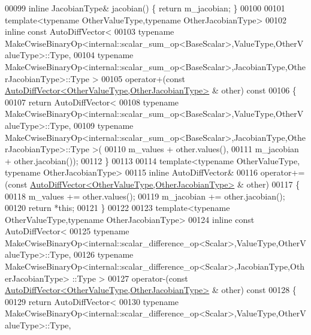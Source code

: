 \begin{DoxyCode}
00099     \textcolor{keyword}{inline} JacobianType& jacobian() \{ \textcolor{keywordflow}{return} m\_jacobian; \}
00100 
00101     \textcolor{keyword}{template}<\textcolor{keyword}{typename} OtherValueType,\textcolor{keyword}{typename} OtherJacobianType>
00102     \textcolor{keyword}{inline} \textcolor{keyword}{const} AutoDiffVector<
00103       \textcolor{keyword}{typename} MakeCwiseBinaryOp<internal::scalar\_sum\_op<BaseScalar>,ValueType,OtherValueType>::Type,
00104       \textcolor{keyword}{typename} MakeCwiseBinaryOp<internal::scalar\_sum\_op<BaseScalar>,JacobianType,OtherJacobianType>::Type 
      >
00105     operator+(\textcolor{keyword}{const} \hyperlink{class_eigen_1_1_auto_diff_vector}{AutoDiffVector<OtherValueType,OtherJacobianType>}
      & other)\textcolor{keyword}{ const}
00106 \textcolor{keyword}{    }\{
00107       \textcolor{keywordflow}{return} AutoDiffVector<
00108       \textcolor{keyword}{typename} MakeCwiseBinaryOp<internal::scalar\_sum\_op<BaseScalar>,ValueType,OtherValueType>::Type,
00109       \textcolor{keyword}{typename} MakeCwiseBinaryOp<internal::scalar\_sum\_op<BaseScalar>,JacobianType,OtherJacobianType>::Type 
      >(
00110         m\_values + other.values(),
00111         m\_jacobian + other.jacobian());
00112     \}
00113 
00114     \textcolor{keyword}{template}<\textcolor{keyword}{typename} OtherValueType, \textcolor{keyword}{typename} OtherJacobianType>
00115     \textcolor{keyword}{inline} AutoDiffVector&
00116     operator+=(\textcolor{keyword}{const} \hyperlink{class_eigen_1_1_auto_diff_vector}{AutoDiffVector<OtherValueType,OtherJacobianType>}
      & other)
00117     \{
00118       m\_values += other.values();
00119       m\_jacobian += other.jacobian();
00120       \textcolor{keywordflow}{return} *\textcolor{keyword}{this};
00121     \}
00122 
00123     \textcolor{keyword}{template}<\textcolor{keyword}{typename} OtherValueType,\textcolor{keyword}{typename} OtherJacobianType>
00124     \textcolor{keyword}{inline} \textcolor{keyword}{const} AutoDiffVector<
00125       \textcolor{keyword}{typename} MakeCwiseBinaryOp<internal::scalar\_difference\_op<Scalar>,ValueType,OtherValueType>::Type,
00126       \textcolor{keyword}{typename} MakeCwiseBinaryOp<internal::scalar\_difference\_op<Scalar>,JacobianType,OtherJacobianType>
      ::Type >
00127     operator-(\textcolor{keyword}{const} \hyperlink{class_eigen_1_1_auto_diff_vector}{AutoDiffVector<OtherValueType,OtherJacobianType>}
      & other)\textcolor{keyword}{ const}
00128 \textcolor{keyword}{    }\{
00129       \textcolor{keywordflow}{return} AutoDiffVector<
00130         \textcolor{keyword}{typename} MakeCwiseBinaryOp<internal::scalar\_difference\_op<Scalar>,ValueType,OtherValueType>::Type,

\end{DoxyCode}
